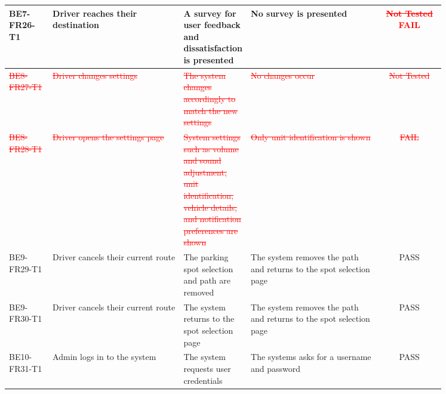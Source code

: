 \documentclass[12pt, titlepage]{article}
\begin{document}
\begin{center}
\begin{tabular}{|p{0.10\linewidth}|p{0.30\linewidth}|p{0.15\linewidth}|p{0.30\linewidth}|c|} 
\hline
BE7-FR26-T1 & Driver reaches their destination & A survey for user feedback and
dissatisfaction is presented & No survey is presented & \textcolor{red}{\st{Not
Tested} FAIL} \\ 
\hline
\textcolor{red}{\st{BE8-FR27-T1}} & \textcolor{red}{\st{Driver changes
settings}} & \textcolor{red}{\st{The system changes accordingly to match the new
settings}} & \textcolor{red}{\st{No changes occur}} & \textcolor{red}{\st{Not
Tested}} \\ 
\hline
\textcolor{red}{\st{BE8-FR28-T1}} & \textcolor{red}{\st{Driver opens the
settings page}} & \textcolor{red}{\st{System settings such as volume and sound
adjustment, unit identification, vehicle details, and notification preferences
are shown}} & \textcolor{red}{\st{Only unit identification is shown}} &
\textcolor{red}{\st{FAIL}} \\ 
\hline
BE9-FR29-T1 & Driver cancels their current route & The parking spot selection
and path are removed & The system removes the path and returns to the spot
selection page & \textcolor{OliveGreen}{PASS} \\ 
\hline
BE9-FR30-T1 & Driver cancels their current route & The system returns to the
spot selection page & The system removes the path and returns to the spot
selection page & \textcolor{OliveGreen}{PASS} \\ 
\hline
BE10-FR31-T1 & Admin logs in to the system & The system requests user
credentials & The systems asks for a username and password &
\textcolor{OliveGreen}{PASS} \\ 
\hline
\end{tabular}
\end{center}
\end{document}
